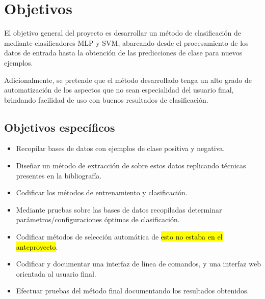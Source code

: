 %
%
%
\section{Objetivos}
%
El objetivo general del proyecto es desarrollar un método de
clasificación de  mediante clasificadores MLP y SVM,
abarcando desde el procesamiento de los datos de entrada hasta la
obtención de las predicciones de clase para nuevos ejemplos.

Adicionalmente, se pretende que el método desarrollado tenga un alto
grado de automatización de los aspectos que no sean especialidad del
usuario final, brindando facilidad de uso con buenos resultados de
clasificación.
%
%
\subsection{Objetivos específicos}
%
\begin{itemize}
\item Recopilar bases de datos con ejemplos de clase positiva y
  negativa.
\item Diseñar un método de extracción de  sobre estos datos
  replicando técnicas presentes en la bibliografía.
\item Codificar los métodos de entrenamiento y clasificación.
\item Mediante pruebas sobre las bases de datos recopiladas determinar
  parámetros/configuraciones óptimas de clasificación.
\item Codificar métodos de selección automática de 
  \hl{esto no estaba en el anteproyecto}.
\item Codificar y documentar una interfaz de línea de comandos, y una
  interfaz web orientada al usuario final.
\item Efectuar pruebas del método final documentando los resultados
  obtenidos.
\end{itemize}
%
